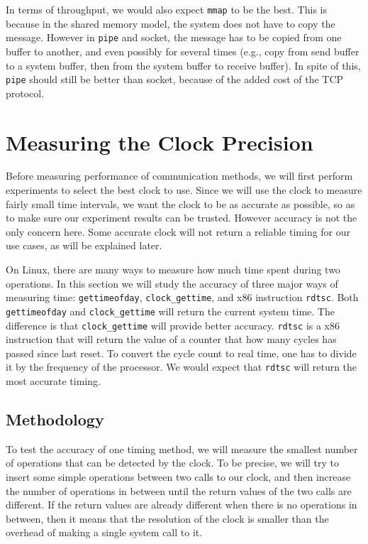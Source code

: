\documentclass{article}
\begin{document}
In terms of throughput, we would also expect \texttt{mmap} to be the best.
This is because in the shared memory model, the system does not have to copy the message.
However in \texttt{pipe} and socket, the message has to be copied from one buffer to another, and even possibly for several times (e.g., copy from send buffer to a system buffer, then from the system buffer to receive buffer).
In spite of this, \texttt{pipe} should still be better than socket, because of the added cost of the TCP protocol.

\section{Measuring the Clock Precision}
\label{sec:clocks}
Before measuring performance of communication methods, we will first perform experiments to select the best clock to use.
Since we will use the clock to measure fairly small time intervals, we want the clock to be as accurate as possible, so as to make sure our experiment results can be trusted.
However accuracy is not the only concern here.
Some accurate clock will not return a reliable timing for our use cases, as will be explained later.

On Linux, there are many ways to measure how much time spent during two operations.
In this section we will study the accuracy of three major ways of measuring time: \texttt{gettimeofday}, \texttt{clock\_gettime}, and x86 instruction \texttt{rdtsc}.
Both \texttt{gettimeofday} and \texttt{clock\_gettime} will return the current system time.
The difference is that \texttt{clock\_gettime} will provide better accuracy.
\texttt{rdtsc} is a x86 instruction that will return the value of a counter that how many cycles has passed since last reset.
To convert the cycle count to real time, one has to divide it by the frequency of the processor.
We would expect that \texttt{rdtsc} will return the most accurate timing.

\subsection{Methodology}
To test the accuracy of one timing method, we will measure the smallest number of operations that can be detected by the clock.
To be precise, we will try to insert some simple operations between two calls to our clock, and then increase the number of operations in between until the return values of the two calls are different.
If the return values are already different when there is no operations in between, then it means that the resolution of the clock is smaller than the overhead of making a single system call to it.
\end{document}
